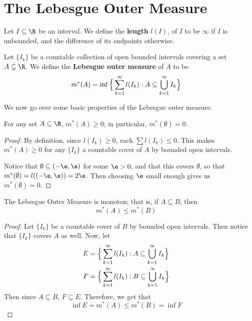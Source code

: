 \section{The Lebesgue Outer Measure}

\begin{definition}
    Let $I \subseteq \R$ be an interval. We define the  \textbf{length} $l(I)$,
    of $I$ to be  $\infty$ if  $I$ is unbounded, and the difference of its
    endpoints otherwise.
\end{definition}

\begin{definition}
    Let $\{I_k\}$ be a countable collection of open bounded intervals covering a
    set $A \subseteq \R$. We define the  \textbf{Lebesgue outer measure} of $A$
    to be
    \begin{equation*}
        m^\ast(A)=\inf{\Big{\{} \sum_{k=1}^\infty{l(I_k)} :
        A \subseteq \bigcup_{k=1}^\infty{I_k} \Big{\}}}
    \end{equation*}
\end{definition}

We now go over some basic properties of the Lebesgue outer measure.

\begin{lemma}\label{8.2.1}
    For any set $A \subseteq \R$,  $m^\ast(A) \geq 0$; in particular,
    $m^\ast(\emptyset)=0$.
\end{lemma}
\begin{proof}
    By definition, since $l(I_k) \geq 0$, each $\sum{l(I_k)} \leq 0$. This makes
    $m^\ast(A) \geq 0$ for any $\{I_k\}$ a countable cover of $A$ by bounded
    open intervals.

    Notice that $\emptyset \subseteq (-\e,\e)$ for some $\e>0$, and that this
    covers $\emptyset$, so that $m^\ast(\emptyset)=l((-\e,\e))=2\e$. Then
    choosing $\e$ small enough gives us  $m^\ast(\emptyset)=0$.
\end{proof}

\begin{lemma}[Monotonicity]\label{8.2.2}
    The Lebesgue Outer Measure is monoton; that is, if $A \subseteq B$, then
    \begin{equation*}
        m^\ast(A) \leq m^\ast(B)
    \end{equation*}
\end{lemma}
\begin{proof}
    Let $\{I_k\}$ be a countable cover of $B$ by bounded open intervals. Then
    notice that  $\{I_k\}$ covers $A$ as well. Now, let
    \begin{align*}
        E   &=  \Big{\{} \sum_{k=1}^\infty{l(I_k)} : A \subseteq
                            \bigcup_{k=1}^\infty{I_k} \Big{\}}  \\
        F   &=  \Big{\{} \sum_{k=1}^\infty{l(I_k)} : B \subseteq
                            \bigcup_{k=1}^\infty{I_k} \Big{\}}  \\
    \end{align*}
    Then since $A \subseteq B$, $F \subseteq E$. Therefore, we get that
    \begin{equation*}
        \inf{E}=m^\ast(A) \leq m^\ast(B)=\inf{F}
    \end{equation*}
\end{proof}

